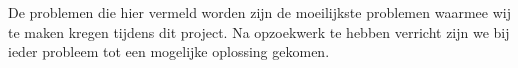 De problemen die hier vermeld worden zijn de moeilijkste problemen waarmee wij te maken kregen tijdens dit project. Na opzoekwerk te hebben verricht zijn we bij ieder probleem tot een mogelijke oplossing gekomen.